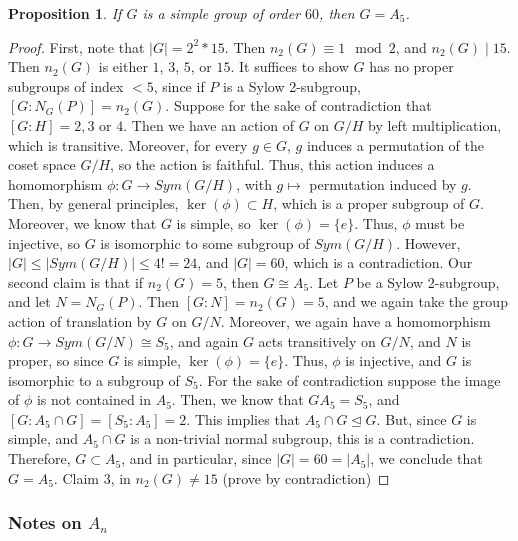 \documentclass[12pt]{article}
\newtheorem{prop}[thm]{Proposition}
\theoremstyle{definition}
\theoremstyle{remark}
\numberwithin{equation}{section}
\newcommand\nsub{\trianglelefteq}
\begin{document}
\begin{prop}
        If $G$ is a simple group of order $60$, then $G = A_5$.
\end{prop}
\begin{proof}
        First, note that $|G| = 2^2*15$. Then $n_2(G) \equiv 1 \mod 2$, and $n_2(G)\;\vert\;15$. Then $n_2(G)$ is either $1$, $3$, $5$, or $15$. It suffices to show $G$ has no proper subgroups of index $<5$, since if $P$ is a Sylow 2-subgroup, $[G:N_G(P)]=n_2(G)$. Suppose for the sake of contradiction that $[G:H] = 2,3$ or $4$. Then we have an action of $G$ on $G/H$ by left multiplication, which is transitive. Moreover, for every $g \in G$, $g$ induces a permutation of the coset space $G/H$, so the action is faithful. Thus, this action induces a homomorphism $\phi:G\rightarrow Sym(G/H)$, with $g\mapsto$ permutation induced by $g$. Then, by general principles, $\ker(\phi) \subset H$, which is a proper subgroup of $G$. Moreover, we know that $G$ is simple, so $\ker(\phi) = \{e\}$. Thus, $\phi$ must be injective, so $G$ is isomorphic to some subgroup of $Sym(G/H)$. However, $|G| \leq |Sym(G/H)| \leq 4! = 24$, and $|G| =60$, which is a contradiction. Our second claim is that if $n_2(G) = 5$, then $G \cong A_5$. Let $P$ be a Sylow 2-subgroup, and let $N = N_G(P)$. Then $[G:N] = n_2(G) = 5$, and we again take the group action of translation by $G$ on $G/N$. Moreover, we again have a homomorphism $\phi:G\rightarrow Sym(G/N) \cong S_5$, and again $G$ acts transitively on $G/N$, and $N$ is proper, so since $G$ is simple, $\ker(\phi) = \{e\}$. Thus, $\phi$ is injective, and $G$ is isomorphic to a subgroup of $S_5$. For the sake of contradiction suppose the image of $\phi$ is not contained in $A_5$. Then, we know that $GA_5 = S_5$, and $[G:A_5 \cap G] = [S_5:A_5] = 2$. This implies that $A_5 \cap G \nsub G$. But, since $G$ is simple, and $A_5 \cap G$ is a non-trivial normal subgroup, this is a contradiction. Therefore, $G \subset A_5$, and in particular, since $|G| = 60 = |A_5|$, we conclude that $G = A_5$. Claim 3, in $n_2(G) \neq 15$ (prove by contradiction)
\end{proof}

\vspace{15pt}

\subsubsection{Notes on $A_n$}
\end{document}
